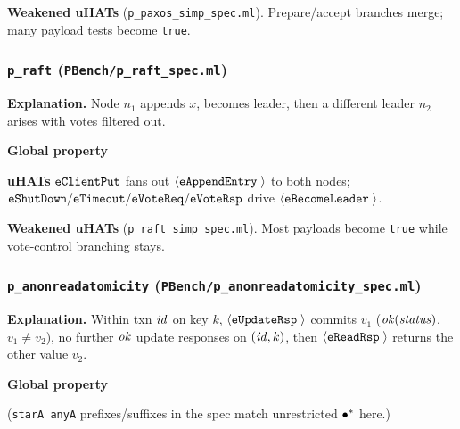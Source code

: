 \textbf{Weakened uHATs} (\texttt{p\_paxos\_simp\_spec.ml}).
Prepare/accept branches merge; many payload tests become \texttt{true}.

\subsubsection*{\texttt{p\_raft} (\texttt{PBench/p\_raft\_spec.ml})}
\textbf{Explanation.}
Node \(n_1\) appends \(x\), becomes leader, then a different leader \(n_2\) arises with votes filtered out.

\textbf{Global property}
\vspace{-.35cm}\par{}
\vspace{-.4cm}\par\nobreak\noindent
\textbf{uHATs}
\(\boldsymbol{{\tt eClientPut}}\) fans out \({\langle} {\boldsymbol{{\tt eAppendEntry}}\;{}} {\rangle}\) to both nodes; \(\boldsymbol{{\tt eShutDown}}/\boldsymbol{{\tt eTimeout}}/\boldsymbol{{\tt eVoteReq}}/\boldsymbol{{\tt eVoteRsp}}\) drive \({\langle} {\boldsymbol{{\tt eBecomeLeader}}\;{}} {\rangle}\).

\textbf{Weakened uHATs} (\texttt{p\_raft\_simp\_spec.ml}).
Most payloads become \texttt{true} while vote-control branching stays.

\subsubsection*{\texttt{p\_anonreadatomicity} (\texttt{PBench/p\_anonreadatomicity\_spec.ml})}
\textbf{Explanation.}
Within txn \(\mathit{id}\) on key \(k\), \({\langle} {\boldsymbol{{\tt eUpdateRsp}}\;{}} {\rangle}\) commits \(v_1\) (\(\mathit{ok}(\mathit{status})\), \(v_1\neq v_2\)), no further \(\mathit{ok}\) update responses on \((\mathit{id},k)\), then \({\langle} {\boldsymbol{{\tt eReadRsp}}\;{}} {\rangle}\) returns the other value \(v_2\).

\textbf{Global property}
\vspace{-.35cm}\par{}
\vspace{-.4cm}\par\nobreak\noindent
(\texttt{starA anyA} prefixes/suffixes in the spec match unrestricted \({\bullet^*}\) here.)

